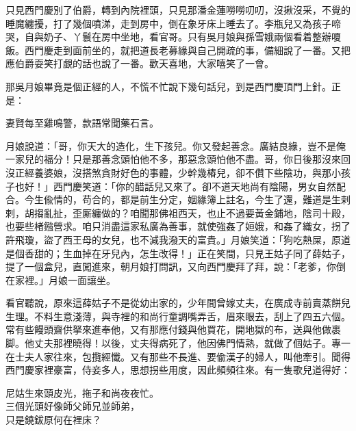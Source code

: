 只見西門慶別了伯爵，轉到內院裡頭，只見那潘金蓮嘮嘮叨叨，沒揪沒采，不覺的睡魔纏擾，打了幾個噴涕，走到房中，倒在象牙床上睡去了。李瓶兒又為孩子啼哭，自與奶子、丫鬟在房中坐地，看官哥。只有吳月娘與孫雪娥兩個看着整辦嗄飯。西門慶走到面前坐的，就把道長老募緣與自己開疏的事，備細說了一番。又把應伯爵耍笑打覷的話也說了一番。歡天喜地，大家嘻笑了一會。

那吳月娘畢竟是個正經的人，不慌不忙說下幾句話兒，到是西門慶頂門上針。正是：

\begin{myquote} 
妻賢每至雞鳴警，款語常聞藥石言。
\end{myquote} 

月娘說道：「哥，你天大的造化，生下孩兒。你又發起善念。廣結良緣，豈不是俺一家兒的福分！只是那善念頭怕他不多，那惡念頭怕他不盡。{}哥，你日後那沒來回沒正經養婆娘，沒搭煞貪財好色的事體，少幹幾樁兒，卻不儹下些陰功，與那小孩子也好！」西門慶笑道：「你的醋話兒又來了。卻不道天地尚有陰陽，男女自然配合。今生偸情的，苟合的，都是前生分定，姻緣簿上註名，今生了還，難道是生剌剌，胡搊亂扯，歪厮纏做的？{}咱聞那佛祖西天，也止不過要黃金鋪地，陰司十殿，也要些楮鏹營求。咱只消盡這家私廣為善事，就使強姦了姮娥，和姦了織女，拐了許飛瓊，盜了西王母的女兒，也不減我潑天的富貴。」{}月娘笑道：「狗吃熱屎，原道是個香甜的；生血掉在牙兒內，怎生改得！」{}正在笑間，只見王姑子同了薛姑子，提了一個盒兒，直闖進來，朝月娘打問訊，又向西門慶拜了拜，說：「老爹，你倒在家裡。」月娘一面讓坐。

看官聽說，原來這薛姑子不是從幼出家的，少年間曾嫁丈夫，在廣成寺前賣蒸餅兒生理。{}不料生意淺薄，與寺裡的和尚行童調嘴弄舌，眉來眼去，刮上了四五六個。常有些饅頭齋供拏來進奉他，又有那應付錢與他買花，開地獄的布，送與他做裹脚。{}他丈夫那裡曉得！以後，丈夫得病死了，他因佛門情熟，就做了個姑子。專一在士夫人家往來，包攬經懺。又有那些不長進、要偸漢子的婦人，叫他牽引。聞得西門慶家裡豪富，侍妾多人，思想拐些用度，因此頻頻往來。有一隻歌兒道得好：

\begin{myquote} 
尼姑生來頭皮光，拖子和尚夜夜忙。\\三個光頭好像師父師兄並師弟，{}\\只是鐃鈸原何在裡床？{}
\end{myquote} 

